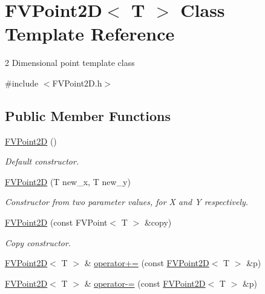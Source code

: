 \hypertarget{classFVL_1_1FVPoint2D}{
\section{FVPoint2D$<$ T $>$ Class Template Reference}
\label{d8/d2b/classFVL_1_1FVPoint2D}
}


2 Dimensional point template class  




{\ttfamily \#include $<$FVPoint2D.h$>$}

\subsection*{Public Member Functions}
\begin{DoxyCompactItemize}
\item 
\hyperlink{classFVL_1_1FVPoint2D_ae7981e40133aa9f3b34864eea7114a1e}{FVPoint2D} ()
\begin{DoxyCompactList}\small\item\em Default constructor. \item\end{DoxyCompactList}\item 
\hyperlink{classFVL_1_1FVPoint2D_a5ae3ba5c698d97efef2bfa6c62fb3c49}{FVPoint2D} (T new\_\-x, T new\_\-y)
\begin{DoxyCompactList}\small\item\em Constructor from two parameter values, for X and Y respectively. \item\end{DoxyCompactList}\item 
\hyperlink{classFVL_1_1FVPoint2D_a1ad5b3c527e89d469b89ffdfafc6477c}{FVPoint2D} (const FVPoint$<$ T $>$ \&copy)
\begin{DoxyCompactList}\small\item\em Copy constructor. \item\end{DoxyCompactList}\item 
\hyperlink{classFVL_1_1FVPoint2D}{FVPoint2D}$<$ T $>$ \& \hyperlink{classFVL_1_1FVPoint2D_af458c950eebca92be86a22acafcda50d}{operator+=} (const \hyperlink{classFVL_1_1FVPoint2D}{FVPoint2D}$<$ T $>$ \&p)
\item 
\hyperlink{classFVL_1_1FVPoint2D}{FVPoint2D}$<$ T $>$ \& \hyperlink{classFVL_1_1FVPoint2D_af10a8c8d4d611dcfb6f842b81329985d}{operator-\/=} (const \hyperlink{classFVL_1_1FVPoint2D}{FVPoint2D}$<$ T $>$ \&p)
\item 

\end{DoxyCompactItemize}
